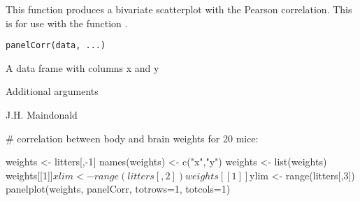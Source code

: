 \begin{Description}\relax
This function produces a bivariate scatterplot with the Pearson 
correlation.  This is for use with the function .
\end{Description}
\begin{Usage}
\begin{verbatim}
panelCorr(data, ...)
\end{verbatim}
\end{Usage}
\begin{Arguments}
\begin{ldescription}
\item[\code{data}] A data frame with columns x and y
\item[\code{...}] Additional arguments
\end{ldescription}
\end{Arguments}
\begin{Author}\relax
J.H. Maindonald
\end{Author}
\begin{Examples}
\begin{ExampleCode}

# correlation between body and brain weights for 20 mice:

weights <- litters[,-1]
names(weights) <-  c("x","y")
weights <- list(weights)
weights[[1]]$xlim <- range(litters[,2])
weights[[1]]$ylim <- range(litters[,3])
panelplot(weights, panelCorr, totrows=1, totcols=1)
\end{ExampleCode}
\end{Examples}

